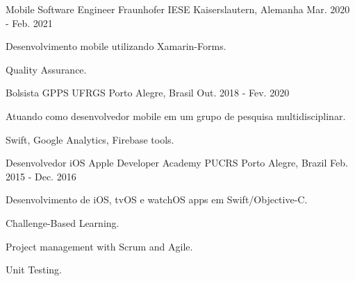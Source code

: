 

\begin{cventries}

  \cventry
    {Mobile Software Engineer} %
    {Fraunhofer IESE} %
    {Kaiserslautern, Alemanha} %
    {Mar. 2020 - Feb. 2021} %
    {
      \begin{cvitems} %
        \item {Desenvolvimento mobile utilizando Xamarin-Forms.}
        \item {Quality Assurance.}
      \end{cvitems}
    }

  \cventry
    {Bolsista} %
    {GPPS UFRGS} %
    {Porto Alegre, Brasil} %
    {Out. 2018 - Fev. 2020} %
    {
      \begin{cvitems} %
        \item {Atuando como desenvolvedor mobile em um grupo de pesquisa multidisciplinar.}
        \item {Swift, Google Analytics, Firebase tools.}
        \end{cvitems}
    }

  \cventry
    {Desenvolvedor iOS} %
    {Apple Developer Academy PUCRS} %
    {Porto Alegre, Brazil} %
    {Feb. 2015 - Dec. 2016} %
    {
      \begin{cvitems} %
        \item {Desenvolvimento de iOS, tvOS e watchOS apps em Swift/Objective-C.}
      \item {Challenge-Based Learning.}
      \item {Project management with Scrum and Agile.}
      \item {Unit Testing.}
      \end{cvitems}
    }

\end{cventries}
